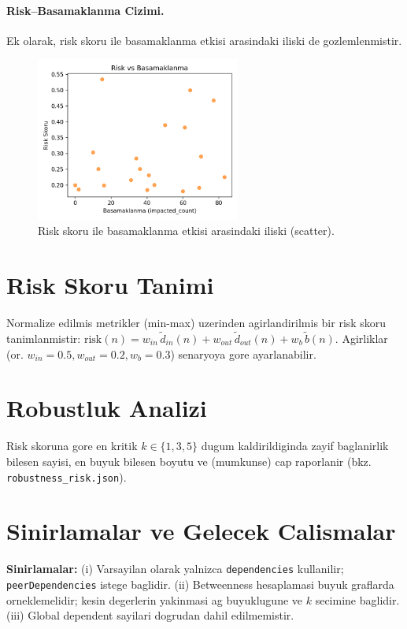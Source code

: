 \documentclass[11pt,a4paper]{article}
\begin{document}
\paragraph{Risk--Basamaklanma Cizimi.} Ek olarak, risk skoru ile basamaklanma etkisi arasindaki iliski de gozlemlenmistir.
\begin{figure}[h]
  \centering
  \includegraphics[width=0.6\textwidth]{risk_vs_cascade.png}
  \caption{Risk skoru ile basamaklanma etkisi arasindaki iliski (scatter).}
\end{figure}

\section{Risk Skoru Tanimi}
Normalize edilmis metrikler (min-max) uzerinden agirlandirilmis bir risk skoru tanimlanmistir: $\mathrm{risk}(n) = w_{in}\,\tilde d_{in}(n) + w_{out}\,\tilde d_{out}(n) + w_b\,\tilde b(n)$. Agirliklar (or. $w_{in}=0.5, w_{out}=0.2, w_b=0.3$) senaryoya gore ayarlanabilir.

\section{Robustluk Analizi}
Risk skoruna gore en kritik $k\in\{1,3,5\}$ dugum kaldirildiginda zayif baglanirlik bilesen sayisi, en buyuk bilesen boyutu ve (mumkunse) cap raporlanir (bkz. \texttt{robustness\_risk.json}).

\section{Sinirlamalar ve Gelecek Calismalar}
\textbf{Sinirlamalar:} (i) Varsayilan olarak yalnizca \texttt{dependencies} kullanilir; \texttt{peerDependencies} istege baglidir. (ii) Betweenness hesaplamasi buyuk graflarda orneklemelidir; kesin degerlerin yakinmasi ag buyuklugune ve $k$ secimine baglidir. (iii) Global dependent sayilari dogrudan dahil edilmemistir.
\end{document}
